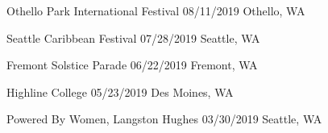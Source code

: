 \begin{cventries}
  \cvpresentation
    {} %
    {Othello Park International Festival} %
    {08/11/2019 \hspace{2mm} Othello, WA} %
    {} %
\vspace{-5mm}
    
  \cvpresentation
    {} %
    {Seattle Caribbean Festival} %
    {07/28/2019 \hspace{2mm} Seattle, WA} %
    {} %
\vspace{-5mm}
    
    

  \cvpresentation
    {} %
    {Fremont Solstice Parade} %
    {06/22/2019 \hspace{2mm} Fremont, WA} %
    {} %
\vspace{-5mm}


  \cvpresentation
    {} %
    {Highline College} %
    {05/23/2019 \hspace{1mm} Des Moines, WA} %
    {} %
\vspace{-5mm}


  \cvpresentation
    {} %
    {Powered By Women, Langston Hughes} %
    {03/30/2019 \hspace{2mm} Seattle, WA} %
    {} %

\end{cventries}
